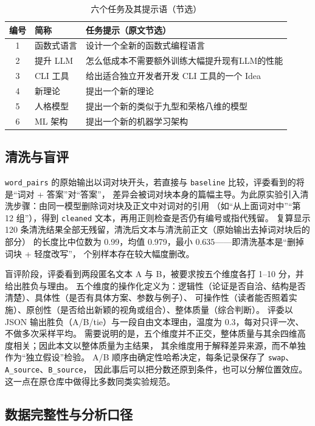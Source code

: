 \documentclass[UTF8,11pt,a4paper]{ctexart}
\newcommand{\wpcond}{\texttt{word\_pairs}}
\newcommand{\basecond}{\texttt{baseline}}
\begin{document}
\begin{table}[htbp]
\centering
\caption{六个任务及其提示语（节选）}\label{tab:task}
\small
\begin{tabular}{@{}clp{9.2cm}@{}}
\toprule
编号 & 简称 & 任务提示（原文节选） \\
\midrule
1 & 函数式语言 & 设计一个全新的函数式编程语言 \\
2 & 提升 LLM & 怎么低成本不需要额外训练大幅提升现有LLM的性能 \\
3 & CLI 工具 & 给出适合独立开发者开发 CLI 工具的一个 Idea \\
4 & 新理论 & 提出一个新的理论 \\
5 & 人格模型 & 提出一个新的类似于九型和荣格八维的模型 \\
6 & ML 架构 & 提出一个新的机器学习架构 \\
\bottomrule
\end{tabular}
\end{table}

\subsection{清洗与盲评}

\wpcond{} 的原始输出以词对块开头，若直接与 \basecond{} 比较，评委看到的将是“词对 + 答案”对“答案”，
差异会被词对块本身的篇幅主导。为此原实验引入清洗步骤：由同一模型删除词对块及正文中对词对的引用
（如“从上面词对中”“第 12 组”），得到 \texttt{cleaned} 文本，再用正则检查是否仍有编号或指代残留。
复算显示 120 条清洗结果全部无残留，清洗后文本与清洗前正文（原始输出去掉词对块后的部分）
的长度比中位数为 0.99，均值 0.979，最小 0.635——即清洗基本是“删掉词块 + 轻度改写”，
个别样本存在较大幅度删改。

盲评阶段，评委看到两段匿名文本 A 与 B，被要求按五个维度各打 1--10 分，并给出胜负与理由。
五个维度的操作化定义为：逻辑性（论证是否自洽、结构是否清楚）、具体性（是否有具体方案、参数与例子）、
可操作性（读者能否照着实施）、原创性（是否给出新颖的视角或组合）、整体质量（综合判断）。
评委以 JSON 输出胜负（A/B/tie）与一段自由文本理由，温度为 0.3，每对只评一次、不做多次采样平均。
需要说明的是，五个维度并不正交，整体质量与其余四维高度相关；因此本文以整体质量为主结果，
其余维度用于解释差异来源，而不单独作为“独立假设”检验。
A/B 顺序由确定性哈希决定，每条记录保存了 \texttt{swap}、\texttt{A\_source}、\texttt{B\_source}，
因此事后可以把分数还原到条件，也可以分解位置效应。这一点在原仓库中做得比多数同类实验规范。

\subsection{数据完整性与分析口径}
\end{document}
